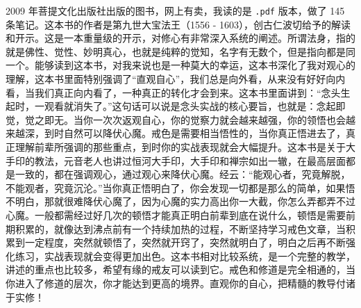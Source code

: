 \begin{book}[《直指法身》]
    2009 年菩提文化出版社出版的图书，网上有卖，我读的是 \texttt{.pdf} 版本，做了 145 条笔记。这本书的作者是第九世大宝法王（1556 - 1603），创古仁波切给予的解读和开示。这是一本重量级的开示，对修心有非常深入系统的阐述。所谓法身，指的就是佛性、觉性、妙明真心，也就是纯粹的觉知，名字有无数个，但是指向都是同一个。能够读到这本书，对我来说也是一种莫大的幸运，这本书深化了我对观心的理解，这本书里面特别强调了“直观自心”，我们总是向外看，从来没有好好向内看，当我们真正向内看了，一种真正的转化才会到来。这本书里面讲到：“念头生起时，一观看就消失了。”这句话可以说是念头实战的核心要旨，也就是：念起即觉，觉之即无。当你一次次返观自心，你的觉察力就会越来越强，你的领悟也会越来越深，到时自然可以降伏心魔。戒色是需要相当悟性的，当你真正悟进去了，真正理解前辈所强调的那些重点，到时你的实战表现就会大幅提升。这本书是关于大手印的教法，元音老人也讲过恒河大手印，大手印和禅宗如出一辙，在最高层面都是一致的，都在强调观心，通过观心来降伏心魔。经云：“能观心者，究竟解脱，不能观者，究竟沉沦。”当你真正悟明白了，你会发现一切都是那么的简单，如果悟不明白，那就很难降伏心魔了，因为心魔的实力高出你一大截，你怎么弄都弄不过心魔。一般都需经过好几次的顿悟才能真正明白前辈到底在说什么，顿悟是需要前期积累的，就像达到沸点前有一个持续加热的过程，不断坚持学习戒色文章，当积累到一定程度，突然就顿悟了，突然就开窍了，突然就明白了，明白之后再不断强化练习，实战表现就会变得更加出色。这本书相对比较系统，是一个完整的教学，讲述的重点也比较多，希望有缘的戒友可以读到它。戒色和修道是完全相通的，当你进入了修道的层次，你才能达到更高的境界。直观你的自心，把精髓的教导付诸于实修！
\end{book}
